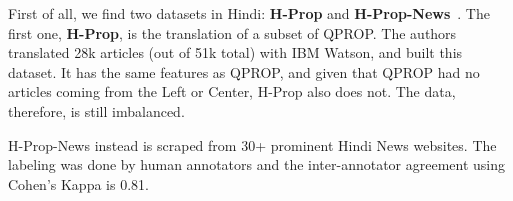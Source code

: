 First of all, we find two datasets in Hindi: \textbf{H-Prop} and \textbf{H-Prop-News}~\citep{chaudhari2022h,chaudhari_deptii_2022_5828240}.
The first one, \textbf{H-Prop}, is the translation of a subset of QPROP. The authors translated 28k articles (out of 51k total) with IBM Watson, and built this dataset. It has the same features as QPROP, and given that QPROP had no articles coming from the Left or Center, H-Prop also does not. The data, therefore, is still imbalanced.

H-Prop-News instead is scraped from 30+ prominent Hindi News websites. The labeling was done by human annotators and the inter-annotator agreement using Cohen’s Kappa is 0.81.

\begin{table}[!htbp]
    \centering
\end{table}
